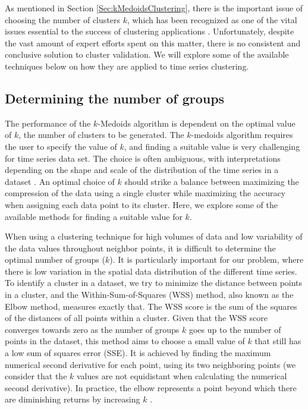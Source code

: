 As mentioned in Section \ref{Sec:kMedoidsClustering}, there is the important issue of choosing the number of clusters $k$, which has been recognized as one of the vital issues essential to the success of clustering applications \cite{Aggarwal2013}. Unfortunately, despite the vast amount of expert efforts spent on this matter, there is no consistent and conclusive solution to cluster validation. We will explore some of the available techniques below on how they are applied to time series clustering.

\subsection{Determining the number of groups}
\label{Sec:domain_number_groups}

The performance of the $k$-Medoids algorithm is dependent on the optimal value of $k$, the number of clusters to be generated. The $k$-medoids algorithm requires the user to specify the value of $k$, and finding a suitable value is very challenging for time series data set. The choice is often ambiguous, with interpretations depending on the shape and scale of the distribution of the time series in a dataset \cite{Liao2005}. An optimal choice of $k$ should strike a balance between maximizing the compression of the data using a single cluster while maximizing the accuracy when assigning each data point to its cluster. Here, we explore some of the available methods for finding a suitable value for $k$.

When using a clustering technique for high volumes of data and low variability of the data values throughout neighbor points, it is difficult to determine the optimal number of groups ($k$). It is particularly important for our problem, where there is low variation in the spatial data distribution of the different time series. To identify a cluster in a dataset, we try to minimize the distance between points in a cluster, and the Within-Sum-of-Squares (WSS) method, also known as the Elbow method, measures exactly that. The WSS score is the sum of the squares of the distances of all points within a cluster. Given that the WSS score converges towards zero as the number of groups $k$ goes up to the number of points in the dataset, this method aims to choose a small value of $k$ that still has a low sum of squares error (SSE). It is achieved by finding the maximum numerical second derivative for each point, using its two neighboring points (we consider that the $k$ values are not equidistant when calculating the numerical second derivative). In practice, the elbow represents a point beyond which there are diminishing returns by increasing $k$ \cite{Han2011}.

